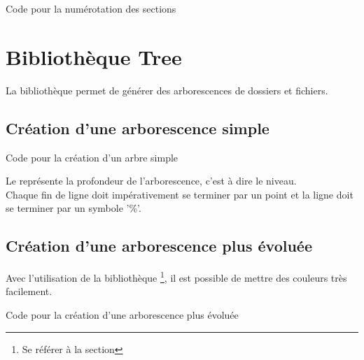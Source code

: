 {
\begin{Latex}{Code pour la numérotation des sections}
\enableSectionPrefix
\end{Latex}

\chapter{Bibliothèque Tree}

La bibliothèque  permet de générer des arborescences de dossiers et fichiers.

\section{Création d'une arborescence simple}


\begin{Latex}{Code pour la création d'un arbre simple}
\end{Latex}


Le  représente la profondeur de l'arborescence, c'est à dire le niveau. \\
Chaque fin de ligne doit impérativement se terminer par un point et la ligne \bold{\\dirtree\{} doit se terminer par un symbole '\%'.


\section{Création  d'une arborescence plus évoluée}

Avec l'utilisation de la bibliothèque  \footnote{Se référer à la section }, il est possible de mettre des couleurs très facilement.\\



\begin{Latex}{Code pour la création d'une arborescence plus évoluée}
\end{Latex}


}
